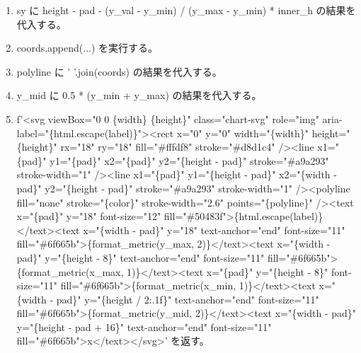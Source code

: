 \documentclass[a4paper,11pt]{article}
\begin{document}
\begin{enumerate}[leftmargin=1.8em]
\item   sy に height - pad - (y\_val - y\_min) / (y\_max - y\_min) * inner\_h の結果を代入する。
\item   coords.append(...) を実行する。
\item polyline に ' '.join(coords) の結果を代入する。
\item y\_mid に 0.5 * (y\_min + y\_max) の結果を代入する。
\item f'<svg viewBox="0 0 \{width\} \{height\}" class="chart-svg" role="img" aria-label="\{html.escape(label)\}"><rect x="0" y="0" width="\{width\}" height="\{height\}" rx="18" ry="18" fill="\#fffdf8" stroke="\#d8d1c4" /><line x1="\{pad\}" y1="\{pad\}" x2="\{pad\}" y2="\{height - pad\}" stroke="\#a9a293" stroke-width="1" /><line x1="\{pad\}" y1="\{height - pad\}" x2="\{width - pad\}" y2="\{height - pad\}" stroke="\#a9a293" stroke-width="1" /><polyline fill="none" stroke="\{color\}" stroke-width="2.6" points="\{polyline\}" /><text x="\{pad\}" y="18" font-size="12" fill="\#50483f">\{html.escape(label)\}</text><text x="\{width - pad\}" y="18" text-anchor="end" font-size="11" fill="\#6f665b">\{format\_metric(y\_max, 2)\}</text><text x="\{width - pad\}" y="\{height - 8\}" text-anchor="end" font-size="11" fill="\#6f665b">\{format\_metric(x\_max, 1)\}</text><text x="\{pad\}" y="\{height - 8\}" font-size="11" fill="\#6f665b">\{format\_metric(x\_min, 1)\}</text><text x="\{width - pad\}" y="\{height / 2:.1f\}" text-anchor="end" font-size="11" fill="\#6f665b">\{format\_metric(y\_mid, 2)\}</text><text x="\{width - pad\}" y="\{height - pad + 16\}" text-anchor="end" font-size="11" fill="\#6f665b">x</text></svg>' を返す。
            \end{enumerate}
\end{document}
